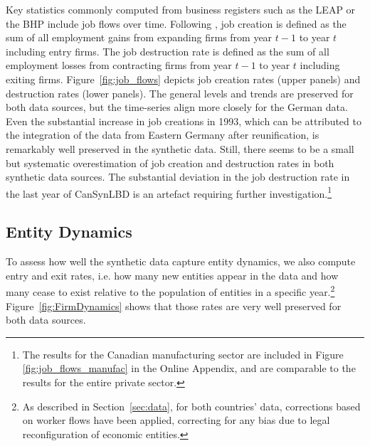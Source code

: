 \documentclass[10pt,twoside]{article}
\begin{document}
Key statistics commonly computed from business registers such as the LEAP or the BHP include job flows over time. Following \citet{DavisHaltiwangerSchuh}, job creation is defined as the sum of all employment gains from expanding firms from year $t-1$ to year $t$ including entry firms. The job destruction rate is defined as the sum of all employment losses from contracting firms from year $t-1$ to year $t$ including exiting firms. Figure~\ref{fig:job_flows} depicts  job creation rates (upper panels) and destruction rates (lower panels). The general levels and trends are preserved for both data sources, but the time-series align more closely for the German data. Even the substantial increase in job creations in 1993, which can be attributed to the integration of the data from Eastern Germany after reunification, is remarkably well preserved in the synthetic data. Still, there seems to be a small but systematic overestimation of job creation and destruction rates in both synthetic data sources. The substantial deviation in the job destruction rate in the last year of CanSynLBD is an artefact  requiring further investigation.\footnote{The results for the Canadian manufacturing sector are included in Figure \ref{fig:job_flows_manufac} in the Online Appendix, and are comparable to the results for the entire private sector.}





\subsection{Entity Dynamics}


To assess how well the synthetic data capture entity dynamics, we also compute entry and exit rates, i.e. how many new entities appear in the data and how many cease to exist relative to the population of entities in a specific year.\footnote{As described in Section~\ref{sec:data}, for both countries' data, corrections based on worker flows have been applied, correcting for any bias due to legal reconfiguration of economic entities.} Figure~\ref{fig:FirmDynamics} shows that those rates are very well preserved for both data sources. 
\end{document}

